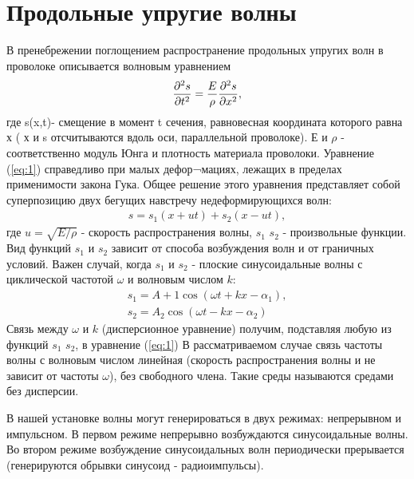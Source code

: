 \section{Продольные упругие волны}
В пренебрежении поглощением распространение продольных упругих волн в проволоке описывается волновым уравнением
\begin{equation}
\label{eq:1}
	\frac{\partial^2s}{\partial t^2}=\frac{E}{\rho}\frac{\partial^2s}{\partial x^2},
\end{equation}
где s(x,t)- смещение в момент t сечения, равновесная координата которого равна х ( х и
s отсчитываются вдоль оси, параллельной проволоке). Е и $\rho$ - соответственно модуль Юнга и плотность материала проволоки. Уравнение (\ref{eq:1}) справедливо при малых дефор¬мациях, лежащих в пределах применимости закона Гука. Общее решение этого уравнения представляет собой суперпозицию двух бегущих навстречу недеформирующихся волн:
\begin{gather*}
	s=s_1(x+ut)+s_2(x-ut),
\end{gather*}
где $u=\sqrt{E/\rho}$ - скорость распространения волны, $s_1$ $s_2$ - произвольные функции. Вид
функций $s_1$ и $s_2$ зависит от способа возбуждения волн и от граничных условий. Важен случай, когда $s_1$ и $s_2$ - плоские синусоидальные волны с циклической частотой $\omega$ и волновым числом $k$:
\begin{gather*}
	s_1=A+1\cos(\omega t+kx-\alpha_1), \\
	s_2=A_2\cos(\omega t -kx- \alpha_2)
\end{gather*}
Связь между $\omega$ и $k$ (дисперсионное уравнение) получим, подставляя любую из функций $s_1$ $s_2$, в уравнение (\ref{eq:1})
В рассматриваемом случае связь частоты волны с волновым числом линейная (скорость распространения волны и не зависит от частоты $\omega$), без свободного члена. Такие среды называются средами без дисперсии.

В нашей установке волны могут генерироваться в двух режимах: непрерывном и импульсном. В первом режиме непрерывно возбуждаются синусоидальные волны. Во втором режиме возбуждение синусоидальных волн периодически прерывается (генерируются обрывки синусоид - радиоимпульсы).

